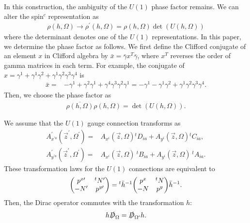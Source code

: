 \documentclass[11pt]{article}
\begin{document}
In this construction, the ambiguity of the $U(1)$ phase factor remains. We can alter the spin$^c$ representation as
\begin{align}
    \rho(h,\Omega) \to \rho^\prime(h,\Omega)= \rho(h,\Omega) \det(U(h,\Omega) )%
\end{align}
where the determinant denotes one of the $U(1)$ representations. In this paper, we determine the phase factor as follows. We first define the Clifford conjugate of an element $x$ in Clifford algebra by $\bar{x}=\bar{\gamma} x^T \bar{\gamma}$, where $x^T$ reverses the order of gamma matrices in each term. For example, the conjugate of $x=\gamma^1+ \gamma^1 \gamma^2 + \gamma^1 \gamma^2 \gamma^3 \gamma^4$ is
\begin{align}
    \bar{x} =& -\gamma^1+ \gamma^2 \gamma^1 + \gamma^4 \gamma^3 \gamma^2 \gamma^1 =-\gamma^1- \gamma^1 \gamma^2 + \gamma^1 \gamma^2 \gamma^3 \gamma^4.
\end{align}
Then, we choose the phase factor as
\begin{align}
\overline{\rho(h,\Omega)} \rho(h,\Omega)=\det(U(h,\Omega)).
\end{align}



We assume that the $U(1)$ gauge connection transforms as
\begin{align}
    A_{x^{\prime a}}^\prime(\vec{z}^\prime,\Omega^\prime)=&  A_{x^{i}}(\vec{z},\Omega) {}^tD_{ia} + A_{y^{i}}(\vec{z},\Omega) {}^tC_{ia},\\
    A_{y^{\prime a}}^\prime (\vec{z}^\prime,\Omega^\prime)=& A_{x^i}(\vec{z},\Omega) ~{}^t B_{ia}  +A_{y^i}(\vec{z},\Omega) ~{}^t A_{ia}.
\end{align}
These transformation laws for the $U(1)$ connections are equivalent to
\begin{align}
     \mqty( p^{x \prime } & {}^tN^\prime \\-N^\prime & p^{y \prime } ) = {}^t \bar{h}^{-1}\mqty( p^x & {}^tN \\-N & p^y ) \bar{h}^{-1} \label{eq:action on U(1)} .
\end{align}
Then, the Dirac operator commutes with the transformation $h$:
\begin{align}
    h \slashed{D}_\Omega= \slashed{D}_{\Omega^\prime} h.
\end{align}
\end{document}
